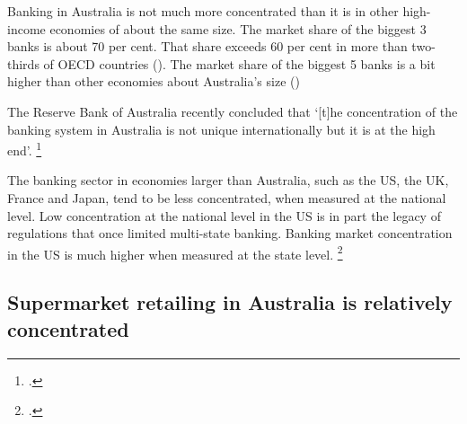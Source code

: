 Banking in Australia is not much more concentrated than it is in other high-income economies of about the same size. The market share of the biggest 3 banks is about 70 per cent. That share exceeds 60 per cent in more than two-thirds of OECD countries (). The market share of the biggest 5 banks is a bit higher than other economies about Australia's size () %


The Reserve Bank of Australia recently concluded that `[t]he concentration of the banking system in Australia is not unique internationally but it is at the high end'.%
\footcite{BullockBigBanks2017}

The banking sector in economies larger than Australia, such as the US, the UK, France and Japan, tend to be less concentrated, when measured at the national level. Low concentration at the national level in the US is in part the legacy of regulations that once limited multi-state banking. %
Banking market concentration in the US is much higher when measured at the state level.%
    \footcites{FDIC-bank-US, Neely-1994, Sherter-CBS-2009}


\clearpage
\subsection{Supermarket retailing in Australia is relatively concentrated}

